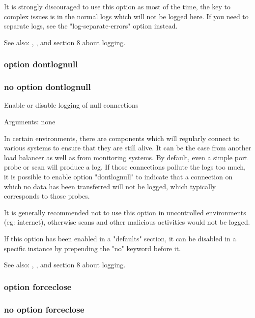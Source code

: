   It is strongly discouraged to use this option as most of the time, the key to
  complex issues is in the normal logs which will not be logged here. If you
  need to separate logs, see the "log-separate-errors" option instead.

  See also: , ,  and section 8 about
             logging.

\subsubsection[option dontlognull]{option dontlognull}
\subsubsection[no option dontlognull]{no option dontlognull}


  Enable or disable logging of null connections


  Arguments: none

  In certain environments, there are components which will regularly connect to
  various systems to ensure that they are still alive. It can be the case from
  another load balancer as well as from monitoring systems. By default, even a
  simple port probe or scan will produce a log. If those connections pollute
  the logs too much, it is possible to enable option "dontlognull" to indicate
  that a connection on which no data has been transferred will not be logged,
  which typically corresponds to those probes.

  It is generally recommended not to use this option in uncontrolled
  environments (eg: internet), otherwise scans and other malicious activities
  would not be logged.

  If this option has been enabled in a "defaults" section, it can be disabled
  in a specific instance by prepending the "no" keyword before it.

  See also: , ,  and section 8 about logging.

\subsubsection[option forceclose]{option forceclose}
\subsubsection[no option forceclose]{no option forceclose}

